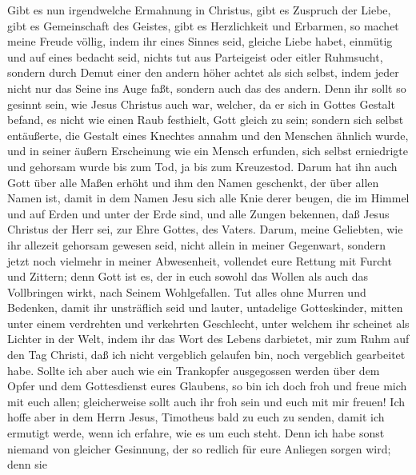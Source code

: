 Gibt es nun irgendwelche Ermahnung in Christus, gibt es
Zuspruch der Liebe, gibt es Gemeinschaft des Geistes, gibt es
Herzlichkeit und Erbarmen,  so machet meine Freude völlig,
indem ihr eines Sinnes seid, gleiche Liebe habet, einmütig und auf eines
bedacht seid,  nichts tut aus Parteigeist oder eitler
Ruhmsucht, sondern durch Demut einer den andern höher achtet als sich
selbst,  indem jeder nicht nur das Seine ins Auge faßt,
sondern auch das des andern.  Denn ihr sollt so gesinnt
sein, wie Jesus Christus auch war,  welcher, da er sich in
Gottes Gestalt befand, es nicht wie einen Raub festhielt, Gott gleich zu
sein;  sondern sich selbst entäußerte, die Gestalt eines
Knechtes annahm und den Menschen ähnlich wurde,  und in
seiner äußern Erscheinung wie ein Mensch erfunden, sich selbst
erniedrigte und gehorsam wurde bis zum Tod, ja bis zum Kreuzestod.
 Darum hat ihn auch Gott über alle Maßen erhöht und ihm
den Namen geschenkt, der über allen Namen ist,  damit in
dem Namen Jesu sich alle Knie derer beugen, die im Himmel und auf Erden
und unter der Erde sind,  und alle Zungen bekennen, daß
Jesus Christus der Herr sei, zur Ehre Gottes, des Vaters.
 Darum, meine Geliebten, wie ihr allezeit gehorsam
gewesen seid, nicht allein in meiner Gegenwart, sondern jetzt noch
vielmehr in meiner Abwesenheit, vollendet eure Rettung mit Furcht und
Zittern;  denn Gott ist es, der in euch sowohl das Wollen
als auch das Vollbringen wirkt, nach Seinem Wohlgefallen.
 Tut alles ohne Murren und Bedenken, 
damit ihr unsträflich seid und lauter, untadelige Gotteskinder, mitten
unter einem verdrehten und verkehrten Geschlecht, unter welchem ihr
scheinet als Lichter in der Welt,  indem ihr das Wort des
Lebens darbietet, mir zum Ruhm auf den Tag Christi, daß ich nicht
vergeblich gelaufen bin, noch vergeblich gearbeitet habe.
 Sollte ich aber auch wie ein Trankopfer ausgegossen
werden über dem Opfer und dem Gottesdienst eures Glaubens, so bin ich
doch froh und freue mich mit euch allen;  gleicherweise
sollt auch ihr froh sein und euch mit mir freuen!  Ich
hoffe aber in dem Herrn Jesus, Timotheus bald zu euch zu senden, damit
ich ermutigt werde, wenn ich erfahre, wie es um euch steht.
 Denn ich habe sonst niemand von gleicher Gesinnung, der
so redlich für eure Anliegen sorgen wird;  denn sie
